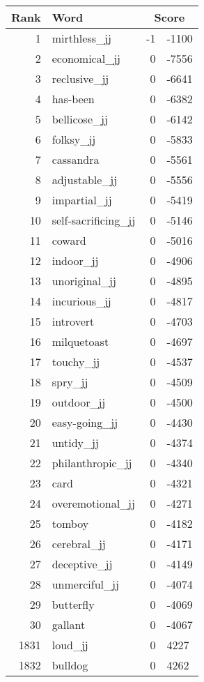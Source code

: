 \begin{longtable}[!htbp]{| rlr@{.}l |}
    \hline
    \textbf{Rank} & \textbf{Word} & \multicolumn{2}{c|}{\textbf{Score}} \\
    \hline
    \endhead
    1 & mirthless\_jj & -1 & -1100 \\
    2 & economical\_jj & 0 & -7556 \\
    3 & reclusive\_jj & 0 & -6641 \\
    4 & has-been & 0 & -6382 \\
    5 & bellicose\_jj & 0 & -6142 \\
    6 & folksy\_jj & 0 & -5833 \\
    7 & cassandra & 0 & -5561 \\
    8 & adjustable\_jj & 0 & -5556 \\
    9 & impartial\_jj & 0 & -5419 \\
    10 & self-sacrificing\_jj & 0 & -5146 \\
    11 & coward & 0 & -5016 \\
    12 & indoor\_jj & 0 & -4906 \\
    13 & unoriginal\_jj & 0 & -4895 \\
    14 & incurious\_jj & 0 & -4817 \\
    15 & introvert & 0 & -4703 \\
    16 & milquetoast & 0 & -4697 \\
    17 & touchy\_jj & 0 & -4537 \\
    18 & spry\_jj & 0 & -4509 \\
    19 & outdoor\_jj & 0 & -4500 \\
    20 & easy-going\_jj & 0 & -4430 \\
    21 & untidy\_jj & 0 & -4374 \\
    22 & philanthropic\_jj & 0 & -4340 \\
    23 & card & 0 & -4321 \\
    24 & overemotional\_jj & 0 & -4271 \\
    25 & tomboy & 0 & -4182 \\
    26 & cerebral\_jj & 0 & -4171 \\
    27 & deceptive\_jj & 0 & -4149 \\
    28 & unmerciful\_jj & 0 & -4074 \\
    29 & butterfly & 0 & -4069 \\
    30 & gallant & 0 & -4067 \\
    1831 & loud\_jj & 0 & 4227 \\
    1832 & bulldog & 0 & 4262 \\

\end{longtable}
